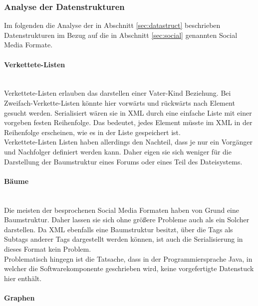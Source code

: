 \documentclass[a4paper]{article}
\begin{document}
	
	\subsubsection{Analyse der Datenstrukturen}
	
	Im folgenden die Analyse der in  Abschnitt \ref{sec:datastruct} beschrieben
	Datenstrukturen im Bezug auf die in Abschnitt \ref{sec:social} genannten
	Social Media Formate.
	
	\paragraph{Verkettete-Listen}\mbox{} \\
	
	Verkettete-Listen erlauben das darstellen einer Vater-Kind Beziehung. Bei
	Zweifach-Verkette-Listen könnte hier vorwärts und rückwärts nach Element
	gesucht werden. Serialisiert wären sie in XML durch eine einfache Liste
	mit einer vorgeben festen Reihenfolge. Das bedeutet, jedes Element müsste
	im XML in der Reihenfolge erscheinen, wie es in der Liste gespeichert ist. \\
	
	Verkettete-Listen Listen haben allerdings den Nachteil, dass je nur ein
	Vorgänger und Nachfolger definiert werden kann. Daher eigen sie sich weniger
	für die Darstellung der Baumstruktur eines Forums oder eines Teil des
	Dateisystems. 	
	
	\paragraph{Bäume}\mbox{} \\
	
	Die meisten der besprochenen Social Media Formaten haben von Grund eine
	Baumstruktur. Daher lassen sie sich ohne größere Probleme auch als ein
	Solcher darstellen. Da XML ebenfalls eine Baumstruktur besitzt, über
	die Tags als Subtags anderer Tags dargestellt werden können, ist auch
	die Serialisierung in dieses Format kein Problem. \\
	
	Problematisch hingegn ist die Tatsache, dass in der Programmiersprache 
	Java, in welcher die Softwarekomponente geschrieben wird, keine vorgefertigte
	Datenstuck hier	enthält.
	
	\paragraph{Graphen}\mbox{} \\
	
\end{document}

